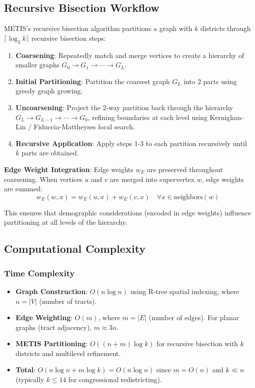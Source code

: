 \subsection{Recursive Bisection Workflow}

METIS's recursive bisection algorithm partitions a graph with $k$ districts through $\lceil \log_2 k \rceil$ recursive bisection steps:

\begin{enumerate}
    \item \textbf{Coarsening}: Repeatedly match and merge vertices to create a hierarchy of smaller graphs $G_0 \to G_1 \to \cdots \to G_L$.
    \item \textbf{Initial Partitioning}: Partition the coarsest graph $G_L$ into 2 parts using greedy graph growing.
    \item \textbf{Uncoarsening}: Project the 2-way partition back through the hierarchy $G_L \to G_{L-1} \to \cdots \to G_0$, refining boundaries at each level using Kernighan-Lin / Fiduccia-Mattheyses local search.
    \item \textbf{Recursive Application}: Apply steps 1-3 to each partition recursively until $k$ parts are obtained.
\end{enumerate}

\textbf{Edge Weight Integration}: Edge weights $w_E$ are preserved throughout coarsening. When vertices $u$ and $v$ are merged into supervertex $w$, edge weights are summed:
\[
w_E(w, x) = w_E(u, x) + w_E(v, x) \quad \forall x \in \text{neighbors}(w)
\]

This ensures that demographic considerations (encoded in edge weights) influence partitioning at all levels of the hierarchy.

\subsection{Computational Complexity}

\subsubsection{Time Complexity}

\begin{itemize}
    \item \textbf{Graph Construction}: $O(n \log n)$ using R-tree spatial indexing, where $n = |V|$ (number of tracts).
    \item \textbf{Edge Weighting}: $O(m)$, where $m = |E|$ (number of edges). For planar graphs (tract adjacency), $m \approx 3n$.
    \item \textbf{METIS Partitioning}: $O((n + m) \log k)$ for recursive bisection with $k$ districts and multilevel refinement.
    \item \textbf{Total}: $O(n \log n + m \log k) = O(n \log n)$ since $m = O(n)$ and $k \ll n$ (typically $k \leq 14$ for congressional redistricting).
\end{itemize}

